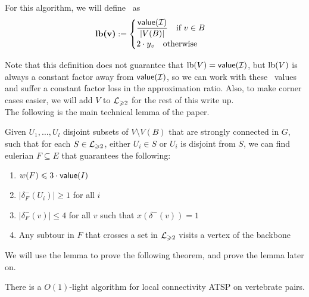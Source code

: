 \documentclass[./main.tex]{subfiles}
\begin{document}
		\begin{definition}
			For this algorithm, we will define \lb\ as
			\[
				\textbf{\textup{lb}(v)}:=
				\begin{cases}
					\dfrac{\textsf{\textup{value}}(\mathcal{I})}{|V(B)|}\quad \text{if }v\in B \\
					2\cdot y_v\quad \text{otherwise}
				\end{cases}
			\]
		\end{definition}

		Note that this definition does not guarantee that $\textup{lb}(V) = \textsf{\textup{value}}(\mathcal{I})$, but $\textup{lb}(V)$ is always a constant factor away from $\textsf{\textup{value}}(\mathcal{I})$, so we can work with these \lb\ values and suffer a constant factor loss in the approximation ratio. Also, to make corner cases easier, we will add $V$ to $\mathcal{L}_{\geqslant 2}$ for the rest of this write up.\vspace{2mm}\\
		The following is the main technical lemma of the paper. \vspace{1mm}
		\begin{lemma}\label{lemma7}
			Given $U_1,\ldots,U_l$ disjoint subsets of $V\setminus V(B)$ that are strongly connected in $G$, such that for each $S\in \mathcal{L}_{\geqslant 2}$, either $U_i\in S$ or $U_i$ is disjoint from $S$, we can find eulerian $F\subseteq E$ that guarantees the following:
			\begin{enumerate}[(1)]
				\item $w(F)\leqslant 3\cdot \textsf{\textup{value}}(I)$\label{lemm:main:1}

				\item $|\delta^-_F(U_i)|\geqslant 1$ for all $i$\label{lemm:main:2}

				\item $|\delta^-_F(v)|\leqslant 4$ for all $v$ such that $x(\delta^-(v)) = 1$\label{lemm:main:3}

				\item Any subtour in $F$ that crosses a set in $\mathcal{L}_{\geqslant 2}$ visits a vertex of the backbone\label{lemm:main:4}
			\end{enumerate}
		\end{lemma}
		We will use the lemma to prove the following theorem, and prove the lemma later on.\\
		\begin{theorem}
			There is a $O(1)$-light algorithm for local connectivity ATSP on vertebrate pairs.
		\end{theorem}
\end{document}
